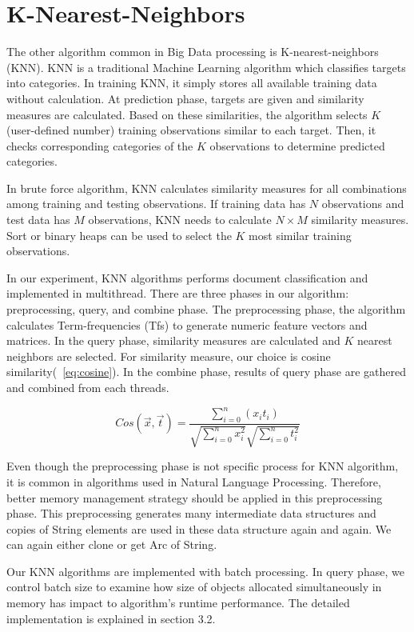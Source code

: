 \section{K-Nearest-Neighbors}
\label{sec:concept_knn}
The other algorithm common in Big Data processing is K-nearest-neighbors (KNN). KNN is a traditional Machine Learning algorithm which classifies targets into categories. 
In training KNN, it simply stores all available training data without calculation. At prediction phase, targets are given and similarity measures are calculated. 
Based on these similarities, the algorithm selects \(K\) (user-defined number) training observations similar to each target. 
Then, it checks corresponding categories of the \(K\) observations to determine predicted categories. 

In brute force algorithm, KNN calculates similarity measures for all combinations among training and testing observations. 
If training data has \(N\) observations and test data has \(M\) observations, KNN needs to calculate \(N \times M\) similarity measures. 
Sort or binary heaps can be used to select the \(K\) most similar training observations.

In our experiment, KNN algorithms performs document classification and implemented in multithread. 
There are three phases in our algorithm: preprocessing, query, and combine phase. 
The preprocessing phase, the algorithm calculates Term-frequencies (Tfs) to generate numeric feature vectors and matrices. 
In the query phase, similarity measures are calculated and \(K\) nearest neighbors are selected. 
For similarity measure, our choice is cosine similarity(~\ref{eq:cosine}). 
In the combine phase, results of query phase are gathered and combined from each threads.

\begin{equation} \label{eq:cosine}
    Cos(\vec{x}, \vec{t})
     = \frac{\sum_{i=0}^{n} (x_i t_i)}{\sqrt{\sum_{i=0}^{n} x_i^2}\sqrt{\sum_{i=0}^{n} t_i^2}}
\end{equation}

Even though the preprocessing phase is not specific process for KNN algorithm, 
it is common in algorithms used in Natural Language Processing. Therefore, better memory management strategy should be applied in this preprocessing phase.
This preprocessing generates many intermediate data structures and copies of String elements are used in these data structure again and again. 
We can again either clone or get Arc of String. 

Our KNN algorithms are implemented with batch processing. In query phase, we control batch size to examine how size of objects allocated simultaneously in memory has impact to algorithm's runtime performance.
The detailed implementation is explained in section 3.2.

